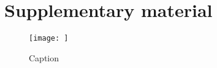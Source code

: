 \documentclass[12pt, letterpaper]{article}
\begin{document}
\section*{Supplementary material}

\begin{figure}
    \centering
    \texttt{[image: ]}
    \caption{Caption}
    \label{fig:enter-label}
\end{figure}
\end{document}

